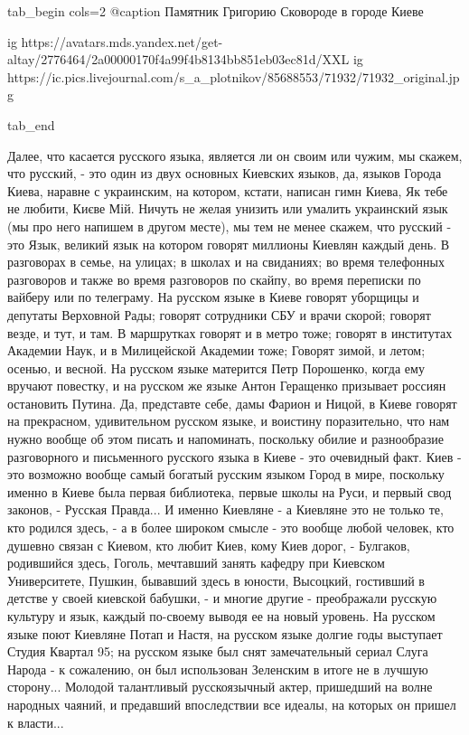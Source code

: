 \ifcmt
tab_begin cols=2
  @caption Памятник Григорию Сковороде в городе Киеве

  ig https://avatars.mds.yandex.net/get-altay/2776464/2a00000170f4a99f4b8134bb851eb03ec81d/XXL
	ig https://ic.pics.livejournal.com/s_a_plotnikov/85688553/71932/71932_original.jpg

tab_end
\fi

Далее, что касается русского языка, является ли он своим или чужим, мы скажем,
что русский, - это один из двух основных Киевских языков, да, языков Города
Киева, наравне с украинским, на котором, кстати, написан гимн Киева, Як тебе не
любити, Києве Мій. Ничуть не желая унизить или умалить украинский язык (мы про
него напишем в другом месте), мы тем не менее скажем, что русский - это Язык,
великий язык на котором говорят миллионы Киевлян каждый день. В разговорах в
семье, на улицах; в школах и на свиданиях; во время телефонных разговоров и
также во время разговоров по скайпу, во время переписки по вайберу или по
телеграму. На русском языке в Киеве говорят уборщицы и депутаты Верховной Рады;
говорят сотрудники СБУ и врачи скорой; говорят везде, и тут, и там. В
маршрутках говорят и в метро тоже; говорят в институтах Академии Наук, и в
Милицейской Академии тоже; Говорят зимой, и летом; осенью, и весной. На русском
языке матерится Петр Порошенко, когда ему вручают повестку, и на русском же
языке Антон Геращенко призывает россиян остановить Путина. Да, представте себе,
дамы Фарион и Ницой, в Киеве говорят на прекрасном, удивительном русском языке,
и воистину поразительно, что нам нужно вообще об этом писать и напоминать,
поскольку обилие и разнообразие разговорного и письменного русского языка в
Киеве - это очевидный факт. Киев - это возможно вообще самый богатый русским
языком Город в мире, поскольку именно в Киеве была первая библиотека, первые
школы на Руси, и первый свод законов, - Русская Правда... И именно Киевляне - а
Киевляне это не только те, кто родился здесь, - а в более широком смысле - это
вообще любой человек, кто душевно связан с Киевом, кто любит Киев, кому Киев
дорог, - Булгаков, родившийся здесь, Гоголь, мечтавший занять кафедру при
Киевском Университете, Пушкин, бывавший здесь в юности, Высоцкий, гостивший в
детстве у своей киевской бабушки, - и многие другие - преображали русскую
культуру и язык, каждый по-своему выводя ее на новый уровень.  На русском языке
поют Киевляне Потап и Настя, на русском языке долгие годы выступает Студия
Квартал 95; на русском языке был снят замечательный сериал Слуга Народа - к
сожалению, он был использован Зеленским в итоге не в лучшую сторону... Молодой
талантливый русскоязычный актер, пришедший на волне народных чаяний, и
предавший впоследствии все идеалы, на которых он пришел к власти...    

